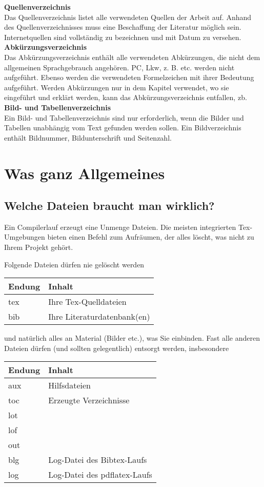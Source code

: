 \textbf{Quellenverzeichnis}\\
Das Quellenverzeichnis listet alle verwendeten Quellen der Arbeit auf. Anhand des Quellenverzeichnisses muss eine Beschaffung der Literatur möglich sein. Internetquellen sind vollständig zu bezeichnen und mit Datum zu versehen. \\

\textbf{Abkürzungsverzeichnis}\\
Das Abkürzungsverzeichnis enthält alle verwendeten Abkürzungen, die nicht dem allgemeinen Sprachgebrauch angehören. PC, Lkw, z. B. etc. werden nicht aufgeführt. Ebenso werden die verwendeten Formelzeichen mit ihrer Bedeutung aufgeführt. Werden Abkürzungen nur in dem Kapitel verwendet, wo sie eingeführt und erklärt werden, kann das Abkürzungsverzeichnis entfallen, \ac{zb}. \\

\textbf{Bild- und Tabellenverzeichnis}\\
Ein Bild- und Tabellenverzeichnis sind nur erforderlich, wenn die Bilder und Tabellen unabhängig vom Text gefunden werden sollen. Ein Bildverzeichnis enthält Bildnummer, Bildunterschrift und Seitenzahl. 

\newpage

\section{Was ganz Allgemeines}
\subsection{Welche Dateien braucht man wirklich?}
Ein Compilerlauf erzeugt eine Unmenge Dateien. Die meisten integrierten Tex-Umgebungen bieten einen Befehl zum Aufräumen, der alles löscht, was nicht zu Ihrem Projekt gehört.

Folgende Dateien dürfen nie gelöscht werden

\begin{tabu}{|X[0.5] | X[3] |}
\hline
\rowfont{\bfseries} Endung & Inhalt \\
\hline
tex & Ihre Tex-Quelldateien\\
bib & Ihre Literaturdatenbank(en)\\
\hline
\end{tabu}
und natürlich alles an Material (Bilder etc.), was Sie einbinden. Fast alle anderen Dateien dürfen (und sollten gelegentlich) entsorgt werden, insbesondere

\begin{tabu}{|X[0.5] | X[3] |}
\hline
\rowfont{\bfseries} Endung & Inhalt \\
\hline
aux & Hilfsdateien\\
toc & Erzeugte Verzeichnisse\\
lot & \\
lof & \\
out & \\
blg & Log-Datei des Bibtex-Laufs \\
log & Log-Datei des pdflatex-Laufs\\
\hline
\end{tabu}


